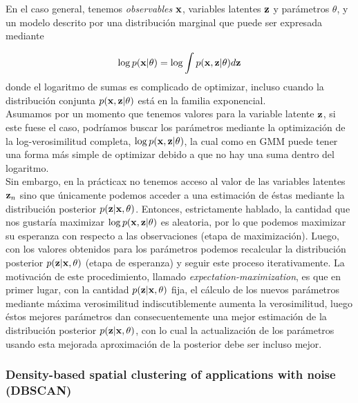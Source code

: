  \begin{mdframed}[style=pendiente, frametitle={\center Expectation-maximization}]

En el caso general, tenemos \emph{observables} $\mathbf{x}$, variables latentes $\mathbf{z}$ y parámetros $\theta$, y un modelo descrito por una distribución marginal que puede ser expresada mediante 

\begin{equation}
	\log p(\mathbf{x}|\theta) = \log \int p(\mathbf{x},\mathbf{z}|\theta)d\mathbf{z}
\end{equation}
donde el logaritmo de sumas es complicado de optimizar, incluso cuando la distribución conjunta $p(\mathbf{x},\mathbf{z}|\theta)$ está en la familia exponencial.\\

Asumamos por un momento que tenemos valores para la variable latente $\mathbf{z}$, si este fuese el caso, podríamos buscar los parámetros mediante la optimización de la log-verosimilitud completa, $\log p(\mathbf{x}, \mathbf{z} |\theta)$, la cual como en GMM puede tener una forma más simple de optimizar debido a que no hay una suma dentro del logaritmo. \\

Sin embargo, en la prácticax no tenemos acceso al valor de las variables latentes $\mathbf{z}_n$ sino que únicamente podemos acceder a una estimación de éstas mediante la distribución posterior $p(\mathbf{z}|\mathbf{x},	\theta)$. Entonces, estrictamente hablado, la cantidad que nos gustaría maximizar $\log p(\mathbf{x}, \mathbf{z} |\theta)$ es aleatoria, por lo que podemos maximizar su esperanza con respecto a las observaciones (etapa de maximización). Luego, con los valores obtenidos para los parámetros podemos recalcular la distribución posterior $p(\mathbf{z}|\mathbf{x},\theta)$ (etapa de esperanza) y seguir este proceso iterativamente. La motivación de este procedimiento, llamado \emph{expectation-maximization}, es que en primer lugar, con la cantidad $p(\mathbf{z}|\mathbf{x},\theta)$ fija, el cálculo de los nuevos parámetros mediante máxima verosimilitud indiscutiblemente aumenta la verosimilitud, luego éstos mejores parámetros dan consecuentemente una mejor estimación de la distribución posterior $p(\mathbf{z}|\mathbf{x},\theta)$, con lo cual la actualización de los parámetros usando esta mejorada aproximación de la posterior debe ser incluso mejor.


\end{mdframed}


\subsubsection{Density-based spatial clustering of applications with noise (DBSCAN)}

